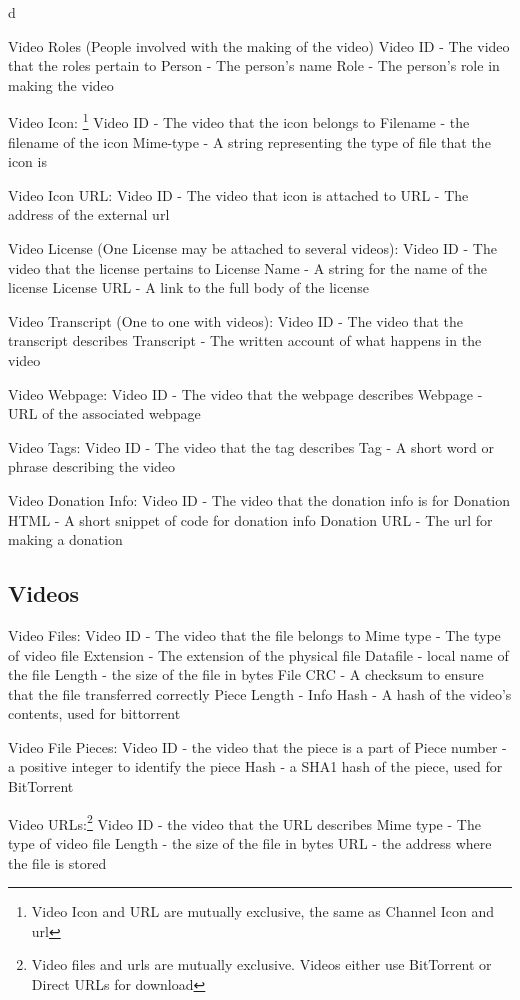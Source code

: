 d\documentclass[a4paper,12pt]{report}
\begin{document}
Video Roles (People involved with the making of the video)
	Video ID - The video that the roles pertain to
	Person - The person's name
	Role - The person's role in making the video

Video Icon:
\footnote{Video Icon and URL are mutually exclusive, the same as Channel Icon and url}
	Video ID - The video that the icon belongs to
	Filename - the filename of the icon
	Mime-type - A string representing the type of file that the icon is

Video Icon URL:
	Video ID - The video that icon is attached to
	URL - The address of the external url

Video License (One License may be attached to several videos):
	Video ID - The video that the license pertains to
	License Name - A string for the name of the license
	License URL - A link to the full body of the license

Video Transcript (One to one with videos):
	Video ID - The video that the transcript describes
	Transcript - The written account of what happens in the video

Video Webpage:
	Video ID - The video that the webpage describes
	Webpage - URL of the associated webpage

Video Tags:
	Video ID - The video that the tag describes
	Tag - A short word or phrase describing the video

Video Donation Info:
	Video ID - The video that the donation info is for
	Donation HTML - A short snippet of code for donation info
	Donation URL - The url for making a donation

\subsection{Videos}
Video Files:
	Video ID - The video that the file belongs to
	Mime type - The type of video file
	Extension - The extension of the physical file
	Datafile - local name of the file 
	Length - the size of the file in bytes
	File CRC - A checksum to ensure that the file transferred correctly
	Piece Length - 
	Info Hash - A hash of the video's contents, used for bittorrent

Video File Pieces:
	Video ID - the video that the piece is a part of
	Piece number - a positive integer to identify the piece
	Hash - a SHA1 hash of the piece, used for BitTorrent

Video URLs:\footnote{Video files and urls are mutually exclusive. Videos either use BitTorrent or Direct URLs for download}
	Video ID - the video that the URL describes
	Mime type - The type of video file
	Length - the size of the file in bytes
	URL - the address where the file is stored
\end{document}
